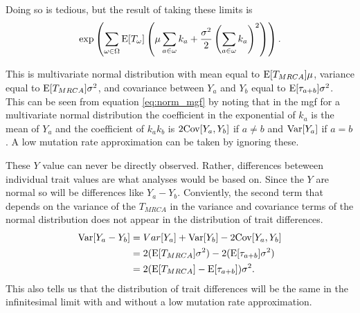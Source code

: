 Doing so is tedious, but the result of taking these limits is
\begin{equation}
  \label{eq:norm_mgf}
  \exp \left( \sum_{\omega \in \Omega}\mathrm{E}[T_{\omega}] \left( \mu 
  \sum_{a \in \omega} k_a + \frac{\sigma^2}{2}\left( \sum_{a \in \omega}
  k_a\right)^2\right)\right).
\end{equation}

This is multivariate normal distribution with mean equal to $\mathrm{E}[T_{MRCA}]\mu$,
variance equal to $\mathrm{E}[T_{MRCA}]\sigma^2$, and covariance between $Y_a$ and $Y_b$
equal to $\mathrm{E}[\tau_{a+b}]\sigma^2$. This can be seen from equation
\eqref{eq:norm_mgf} by noting that in the mgf for a multivariate normal
distribution the coefficient in the exponential of $k_a$ is the mean of $Y_a$
and the coefficient of $k_ak_b$ is $2\mathrm{Cov}[Y_a,Y_b]$ if $a\neq b$ and $\mathrm{Var}[Y_a]$
if $a=b$. A low mutation rate approximation can be taken by ignoring these.

These $Y$ value can never be directly observed. Rather, differences beteween
individual trait values are what analyses would be based on. Since the $Y$ are
normal so will be differences like $Y_a-Y_b$. Conviently, the second term that
depends on the variance of the $T_{MRCA}$ in the variance and covariance terms
of the normal distribution does not appear in the distribution of trait
differences.
\begin{align*}
  \mathrm{Var}[Y_a-Y_b] &= Var[Y_a] + \mathrm{Var}[Y_b] - 2\mathrm{Cov}[Y_a,Y_b]\\
                &= 2(\mathrm{E}[T_{MRCA}]\sigma^2 ) -
                  2(\mathrm{E}[\tau_{a+b}]\sigma^2 )\\
                &= 2(\mathrm{E}[T_{MRCA}] - \mathrm{E}[\tau_{a+b}])\sigma^2.
\end{align*}
This also tells us that the distribution of trait differences will be the same
in the infinitesimal limit with and without a low mutation rate approximation.

